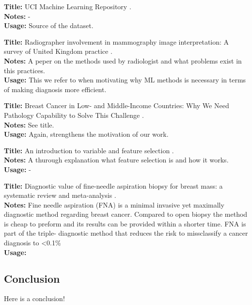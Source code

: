 \documentclass[a4paper]{article}
\begin{document}
\noindent
\textbf{Title:} {UCI} Machine Learning Repository \cite{dua:2017}.
\\
\textbf{Notes:} -
\\
\textbf{Usage:} Source of the dataset.
\\\par

\noindent
\textbf{Title:} Radiographer involvement in mammography image interpretation: A survey of United Kingdom practice \cite{culpan2016}.
\\
\textbf{Notes:} A peper on the methods used by radiologist and what problems exist in this practices.
\\
\textbf{Usage:} This we refer to when motivating why ML methods is necessary in terms of making diagnosis more efficient.
\\\par

\noindent
\textbf{Title:} Breast Cancer in Low- and Middle-Income Countries: Why We Need Pathology Capability to Solve This Challenge \cite{martei2018}.
\\
\textbf{Notes:} See title.
\\
\textbf{Usage:} Again, strengthens the motivation of our work.
\\\par

\noindent
\textbf{Title:} An introduction to variable and feature selection \cite{guyon2003}.
\\
\textbf{Notes:} A thurough explanation what feature selection is and how it works.
\\
\textbf{Usage:} -
\\\par

\noindent
\textbf{Title:} Diagnostic value of fine-needle aspiration biopsy for breast mass: a systematic review and meta-analysis \cite{Yu2012}.
\\
\textbf{Notes:} Fine needle aspiration (FNA) is a minimal invasive yet maximally diagnostic method regarding breast cancer. Compared to open biopsy the method is cheap to preform and its results can be provided within a shorter time. FNA is part of the triple- diagnostic method that reduces the risk to missclassify a cancer diagnosis to \textless 0.1\%
\\
\textbf{Usage:}
\\\par



\subsection{Conclusion}

Here is a conclusion!



\end{document}
